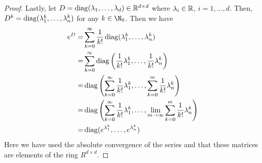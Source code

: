 \begin{proof}
    Lastly, let $D = \operatorname{diag}(\lambda_1, \dots, \lambda_d) \in \mathbb R^{d \times d}$
	where $\lambda_i \in \mathbb R$, $i= 1, \dots, d$. Then, $D^k = \operatorname{diag}(\lambda_1^k,
	\dots, \lambda_n^k)$ for any $k \in \N_0$. Then we have
	\begin{align}
	e^D =& \sum_{k=0}^\infty \frac{1}{k!} \operatorname{diag}(\lambda_1^k, \dots, \lambda_n^k) \\
	=& \sum_{k=0}^\infty \operatorname{diag} \left(\frac{1}{k!}\lambda_1^k, \dots,
		\frac{1}{k!}\lambda_n^k \right) \\
	=& \operatorname{diag} \left(\sum_{k=0}^\infty \frac{1}{k!} \lambda_1^k, \dots, \sum _{k=0} ^m
		\frac{1}{k!}\lambda_n^k \right) \\
	=& \operatorname{diag} \left(\sum_{k=0}^\infty \frac{1}{k!} \lambda_1^k, \dots, \lim_{m \to \infty}
		\sum _{k=0} ^m \frac{1}{k!}\lambda_n^k 	\right) \\
	=& \operatorname{diag}(e^{\lambda_1^k}, \dots, e^{\lambda_n^k})
	\end{align}
	Here we have used the absolute convergence of the series and that these matrices are
	elements of the ring $R^{d \times d}$.
	\end{proof}

